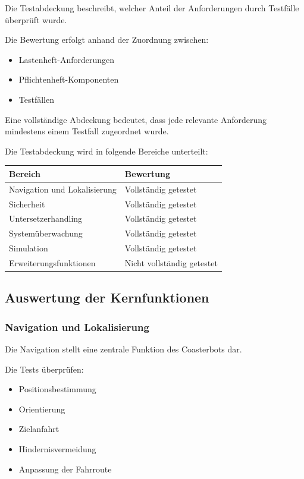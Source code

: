 \documentclass[
  a4paper,
  12pt,
  DIV=12,        %
  parskip=half,  %
  headings=small %
]{scrartcl}
\theoremstyle{definition}
\providecommand{\tightlist}{%
  \setlength{\itemsep}{0pt}\setlength{\parskip}{0pt}}
\theoremstyle{definition}
\begin{document}
Die Testabdeckung beschreibt, welcher Anteil der Anforderungen durch
Testfälle überprüft wurde.

Die Bewertung erfolgt anhand der Zuordnung zwischen:

\begin{itemize}
\tightlist
\item
  Lastenheft-Anforderungen
\item
  Pflichtenheft-Komponenten
\item
  Testfällen
\end{itemize}

Eine vollständige Abdeckung bedeutet, dass jede relevante Anforderung
mindestens einem Testfall zugeordnet wurde.

Die Testabdeckung wird in folgende Bereiche unterteilt:

\begin{longtable}[]{@{}ll@{}}
\toprule\noalign{}
Bereich & Bewertung \\
\midrule\noalign{}
\endhead
\bottomrule\noalign{}
\endlastfoot
Navigation und Lokalisierung & Vollständig getestet \\
Sicherheit & Vollständig getestet \\
Untersetzerhandling & Vollständig getestet \\
Systemüberwachung & Vollständig getestet \\
Simulation & Vollständig getestet \\
Erweiterungsfunktionen & Nicht vollständig getestet \\
\end{longtable}

\subsection{Auswertung der
Kernfunktionen}\label{auswertung-der-kernfunktionen}

\subsubsection{Navigation und
Lokalisierung}\label{navigation-und-lokalisierung}

Die Navigation stellt eine zentrale Funktion des Coasterbots dar.

Die Tests überprüfen:

\begin{itemize}
\tightlist
\item
  Positionsbestimmung
\item
  Orientierung
\item
  Zielanfahrt
\item
  Hindernisvermeidung
\item
  Anpassung der Fahrroute
\end{itemize}
\end{document}
